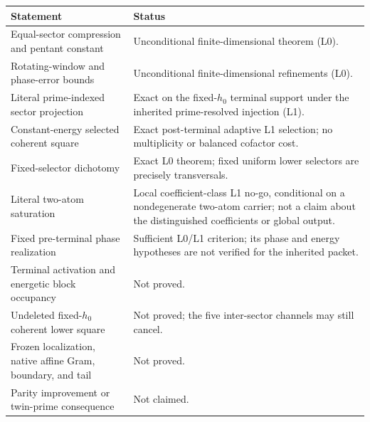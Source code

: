 \begin{center}
\small
\begin{tabular}{>{\raggedright\arraybackslash}p{}
                >{\raggedright\arraybackslash}p{}}
\toprule
Statement & Status \\
\midrule
Equal-sector compression and pentant constant
& Unconditional finite-dimensional theorem (L0). \\
Rotating-window and phase-error bounds
& Unconditional finite-dimensional refinements (L0). \\
Literal prime-indexed sector projection
& Exact on the fixed-\(h_0\) terminal support under the inherited
  prime-resolved injection (L1). \\
Constant-energy selected coherent square
& Exact post-terminal adaptive L1 selection; no multiplicity or balanced
  cofactor cost. \\
Fixed-selector dichotomy
& Exact L0 theorem; fixed uniform lower selectors are precisely
  transversals. \\
Literal two-atom saturation
& Local coefficient-class L1 no-go, conditional on a nondegenerate
  two-atom carrier; not a claim about the distinguished coefficients or
  global output. \\
Fixed pre-terminal phase realization
& Sufficient L0/L1 criterion; its phase and energy hypotheses are not
  verified for the inherited packet. \\
Terminal activation and energetic block occupancy
& Not proved. \\
Undeleted fixed-\(h_0\) coherent lower square
& Not proved; the five inter-sector channels may still cancel. \\
Frozen localization, native affine Gram, boundary, and tail
& Not proved. \\
Parity improvement or twin-prime consequence
& Not claimed. \\
\bottomrule
\end{tabular}
\end{center}


